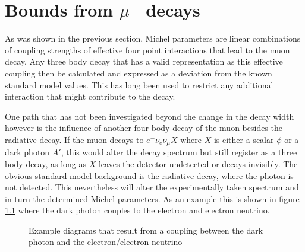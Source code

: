 \chapter{Bounds from \texorpdfstring{$\mu^-$}{muon} decays}
\label{ch:MuBounds}
As was shown in the previous section, Michel parameters are linear combinations of coupling strengths of effective four point interactions that lead to the muon decay. Any three body decay that has a valid representation as this effective coupling then be calculated and expressed as a deviation from the known standard model values. This has long been used to restrict any additional interaction that might contribute to the decay. 

One path that has not been investigated beyond the change in the decay width however is the influence of another four body decay of the muon besides the radiative decay. If the muon decays to $e^-\bar{\nu}_e \nu_\mu X$ where $X$ is either a scalar $\phi$ or a dark photon $A'$, this would alter the decay spectrum but still register as a three body decay, as long as $X$ leaves the detector undetected or decays invisibly. The obvious standard model background is the radiative decay, where the photon is not detected. This nevertheless will alter the experimentally taken spectrum and in turn the determined Michel parameters. As an example this is shown in figure \ref{fg:MuonBSMContribution} where the dark photon couples to the electron and electron neutrino.
\begin{figure}[ht]
\centering
\begin{subfigure}{.5\textwidth}
\end{subfigure}%
\begin{subfigure}{.5\textwidth}
\end{subfigure}
\caption{Example diagrams that result from a coupling between the dark photon and the electron/electron neutrino }
\label{fg:MuonBSMContribution}
\end{figure}
